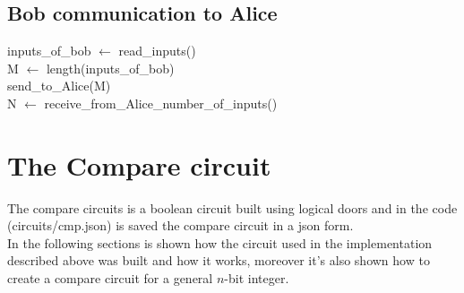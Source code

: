 \documentclass[12pt, letterpaper]{article}
\begin{document}
\subsection{Bob communication to Alice}
\begin{algorithm}[H]
    \SetAlgoLined
     inputs\_of\_bob $\leftarrow$ read\_inputs()\\
    M $\leftarrow$ length(inputs\_of\_bob)\\
    send\_to\_Alice(M)\\
    N $\leftarrow$ receive\_from\_Alice\_number\_of\_inputs()\\
\end{algorithm}

\section{The Compare circuit}
\label{sec:compare}
The compare circuits is a boolean circuit built using logical doors and in the code (circuits/cmp.json) is saved the compare circuit in a json form.\\
In the following sections is shown how the circuit used in the implementation described above was built and how it works, moreover it's also shown how to create a compare circuit for a general $n$-bit integer.
\end{document}

